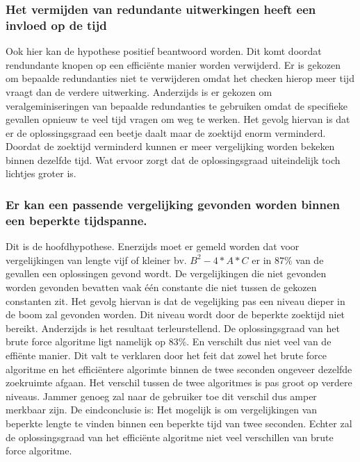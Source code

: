 \documentclass[Main.tex]{subfiles}
\begin{document}
\subsubsection{Het vermijden van redundante uitwerkingen heeft een invloed op de tijd}
Ook hier kan de hypothese positief beantwoord worden. Dit komt doordat rendundante knopen op een efficiënte manier worden verwijderd. Er is gekozen om bepaalde redundanties niet te verwijderen omdat het checken hierop meer tijd vraagt dan de verdere uitwerking. Anderzijds is er gekozen om veralgeminiseringen van bepaalde redundanties te gebruiken omdat de specifieke gevallen opnieuw te veel tijd vragen om weg te werken. Het gevolg hiervan is dat er de oplossingsgraad een beetje daalt maar de zoektijd enorm verminderd. Doordat de zoektijd verminderd kunnen er meer vergelijking worden bekeken binnen dezelfde tijd. Wat ervoor zorgt dat de oplossingsgraad uiteindelijk toch lichtjes groter is.
\subsubsection{Er kan een passende vergelijking gevonden worden binnen een beperkte tijdspanne.}
Dit is de hoofdhypothese. Enerzijds moet er gemeld worden dat voor vergelijkingen van lengte vijf of kleiner bv. $B^{2} - 4 \ast A \ast C$ er in $87\%$ van de gevallen een oplossingen gevond wordt. De vergelijkingen die niet gevonden worden gevonden bevatten vaak \'e\'en constante die niet tussen de gekozen constanten zit. Het gevolg hiervan is dat de vegelijking pas een niveau dieper in de boom zal gevonden worden. Dit niveau wordt door de beperkte zoektijd niet bereikt. Anderzijds is het resultaat terleurstellend. De oplossingsgraad van het brute force algoritme ligt namelijk op $83\%$. En verschilt dus niet veel van de effi\"ente manier. Dit valt te verklaren door het feit dat zowel het brute force algoritme en het effici\"entere algorimte binnen de twee seconden ongeveer dezelfde zoekruimte afgaan. Het verschil tussen de twee algoritmes is pas groot op verdere niveaus. Jammer genoeg zal naar de gebruiker toe dit verschil dus amper merkbaar zijn. De eindconclusie is: Het mogelijk is om vergelijkingen van beperkte lengte te vinden binnen een beperkte tijd van twee seconden. Echter zal de oplossingsgraad van het effici\"ente algoritme niet veel verschillen van brute force algoritme.
\end{document}
